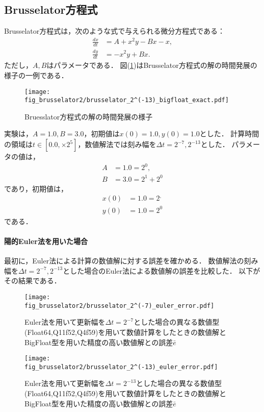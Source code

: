 \subsection{Brusselator方程式}
Brusselator方程式は，次のような式で与えられる微分方程式である：
\begin{align}
    \frac{dx}{dt} &= A + x^2y - Bx - x,\\
    \frac{dy}{dt} &= -x^2y + Bx.
\end{align}
ただし，$A,B$はパラメータである．
図(\ref{fig:brusselator})はBrusselator方程式の解の時間発展の様子の一例である．
\begin{figure}[H]
    \centering
    \begin{minipage}[b]{0.9\columnwidth}
            \texttt{[image: fig\_brusselator2/brusselator\_2^(-13)\_bigfloat\_exact.pdf]}
    \end{minipage}
    \caption{Bruesslator方程式の解の時間発展の様子}
    \label{fig:brusselator}
\end{figure}
実験は，$A=1.0, B=3.0$，初期値は$x(0) = 1.0, y(0) = 1.0$とした．
計算時間の領域は$t \in [0.0, \times 2^5]$，数値解法では刻み幅を$\Delta t =  2^{-7}, 2^{-13}$とした．
パラメータの値は，
\begin{align}
    A &= 1.0 = 2^0, \\
    B &= 3.0 = 2^1 + 2^0
\end{align}
であり，初期値は，
\begin{align}
    x(0) &= 1.0 = 2^, \\
    y(0) &= 1.0 = 2^0
\end{align} 
である．
\paragraph*{陽的Euler法を用いた場合}
最初に，Euler法による計算の数値解に対する誤差を確かめる．
数値解法の刻み幅を$\Delta t = 2^{-7},2^{-13}$とした場合のEuler法による数値解の誤差を比較した．
以下がその結果である．
\begin{figure}[H]
    \centering
    \begin{minipage}[b]{0.49\columnwidth}
        \centering
        \texttt{[image: fig\_brusselator2/brusselator\_2^(-7)\_euler\_error.pdf]}
        \caption{Euler法を用いて更新幅を$\Delta t = 2^{-7}$とした場合の異なる数値型(Float64,Q11f52,Q4f59)を用いて数値計算をしたときの数値解とBigFloat型を用いた精度の高い数値解との誤差$\bar{e}$}
        \label{fig:brusselator_2^(-7)_euler_error}
    \end{minipage}
    \begin{minipage}[b]{0.49\columnwidth}
        \centering
        \texttt{[image: fig\_brusselator2/brusselator\_2^(-13)\_euler\_error.pdf]}
        \caption{Euler法を用いて更新幅を$\Delta t =  2^{-13}$とした場合の異なる数値型(Float64,Q11f52,Q4f59)を用いて数値計算をしたときの数値解とBigFloat型を用いた精度の高い数値解との誤差$\bar{e}$}
        \label{fig:brusselator_2^(-13)_euler_error}
    \end{minipage}
\end{figure}

